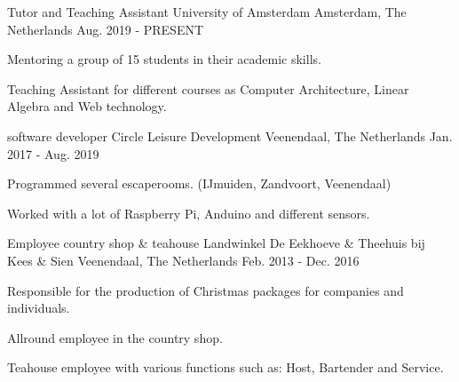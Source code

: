 


\begin{cventries}


\cventry
{Tutor and Teaching Assistant} %
{University of Amsterdam} %
{Amsterdam, The Netherlands} %
{Aug. 2019 - PRESENT} %
{ %
\begin{cvitems}
\item {Mentoring a group of 15 students in their academic skills.}
\item {Teaching Assistant for different courses as Computer Architecture, Linear Algebra and Web technology.}
\end{cvitems}
}

\cventry
{software developer} %
{Circle Leisure Development} %
{Veenendaal, The Netherlands} %
{Jan. 2017 - Aug. 2019} %
{ %
\begin{cvitems}
\item {Programmed several escaperooms. (IJmuiden, Zandvoort, Veenendaal)}
\item {Worked with a lot of Raspberry Pi, Anduino and different sensors.}
\end{cvitems}
}


\cventry
{Employee country shop \& teahouse} %
{Landwinkel De Eekhoeve \& Theehuis bij Kees \& Sien} %
{Veenendaal, The Netherlands} %
{Feb. 2013 - Dec. 2016} %
{ %
\begin{cvitems}
\item {Responsible for the production of Christmas packages for companies and individuals.}
\item {Allround employee in the country shop.}
\item {Teahouse employee with various functions such as: Host, Bartender and Service.}
\end{cvitems}
}


\end{cventries}
